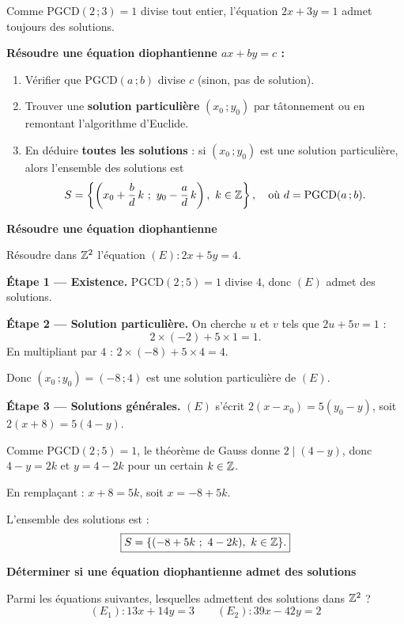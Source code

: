 \begin{exemple}
	Comme $\mathrm{PGCD}(2\,;3) = 1$ divise tout entier, l'équation $2x + 3y = 1$ admet toujours
	des solutions.
\end{exemple}

\begin{methode}
	\textbf{Résoudre une équation diophantienne $ax + by = c$ :}
	\begin{enumerate}
		\item Vérifier que $\mathrm{PGCD}(a\,;b)$ divise $c$ (sinon, pas de solution).
		\item Trouver une \textbf{solution particulière} $(x_0\,;y_0)$ par tâtonnement ou en
		remontant l'algorithme d'Euclide.
		\item En déduire \textbf{toutes les solutions} : si $(x_0\,;y_0)$ est une solution particulière,
		alors l'ensemble des solutions est
		$$
		S = \left\{\left(x_0 + \frac{b}{d}\,k\ ;\ y_0 - \frac{a}{d}\,k\right),\ k \in \mathbb{Z}\right\},
		\quad \text{où } d = \mathrm{PGCD}(a\,;b).
		$$
	\end{enumerate}
\end{methode}

\exerciceresolu
\textbf{Résoudre une équation diophantienne}

Résoudre dans $\mathbb{Z}^2$ l'équation $(E) : 2x + 5y = 4$.

\solution

\textbf{Étape 1 — Existence.}
$\mathrm{PGCD}(2\,;5) = 1$ divise $4$, donc $(E)$ admet des solutions.

\textbf{Étape 2 — Solution particulière.}
On cherche $u$ et $v$ tels que $2u + 5v = 1$ :
$$
2 \times (-2) + 5 \times 1 = 1.
$$
En multipliant par $4$ : $2 \times (-8) + 5 \times 4 = 4$.

Donc $(x_0\,;y_0) = (-8\,;4)$ est une solution particulière de $(E)$.

\textbf{Étape 3 — Solutions générales.}
$(E)$ s'écrit $2(x - x_0) = 5(y_0 - y)$, soit $2(x+8) = 5(4-y)$.

Comme $\mathrm{PGCD}(2\,;5) = 1$, le théorème de Gauss donne $2 \mid (4-y)$,
donc $4 - y = 2k$ et $y = 4 - 2k$ pour un certain $k \in \mathbb{Z}$.

En remplaçant : $x + 8 = 5k$, soit $x = -8 + 5k$.

L'ensemble des solutions est :
$$
\boxed{S = \{(-8+5k\ ;\ 4-2k),\ k \in \mathbb{Z}\}.}
$$

\exerciceresolu
\textbf{Déterminer si une équation diophantienne admet des solutions}

Parmi les équations suivantes, lesquelles admettent des solutions dans $\mathbb{Z}^2$ ?
$$
(E_1) : 13x + 14y = 3 \qquad (E_2) : 39x - 42y = 2
$$

